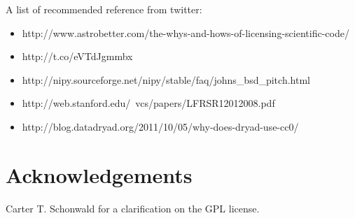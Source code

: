 \documentclass[letterpaper]{article}
\begin{document}
A list of recommended reference from twitter:

\begin{itemize}
  \item http://www.astrobetter.com/the-whys-and-hows-of-licensing-scientific-code/
  \item http://t.co/eVTdJgmmbx
  \item http://nipy.sourceforge.net/nipy/stable/faq/johns_bsd_pitch.html
  \item http://web.stanford.edu/~vcs/papers/LFRSR12012008.pdf
  \item http://blog.datadryad.org/2011/10/05/why-does-dryad-use-cc0/
\end{itemize}

\section{Acknowledgements}

Carter T. Schonwald for a clarification on the GPL license.



\end{document}
